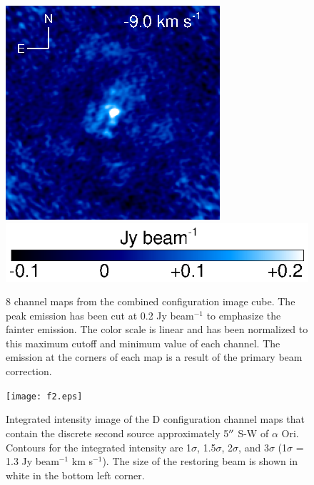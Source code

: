 \documentclass[preprint2]{aastex}
\begin{document}
\begin{figure}[hbt!]
{          \includegraphics[]{chan34.ps}
         }
\includegraphics[trim=0pt 20pt 180pt 10pt]{color_bar.ps}
\caption{8 channel maps from the combined configuration image cube. The peak emission has been cut at 0.2 Jy beam${{}^{-1}}$ to emphasize the fainter emission. The color scale is linear and has been normalized to this maximum cutoff and minimum value of each channel. The emission at the corners of each map is a result of the primary beam correction.}
\label{fig:fig3}
\end{figure}

\clearpage

\begin{figure}
\texttt{[image: f2.eps]}
\caption{Integrated intensity image of the D configuration channel maps that contain the discrete second source approximately 5$\mbox{$^{\prime\prime}$}$ S-W of $\alpha$ Ori. Contours for the integrated intensity are 1$\sigma$, 1.5$\sigma$, 2$\sigma$, and 3$\sigma$ (1$\sigma$ = 1.3 Jy beam${}^{-1}$ km s${}^{-1}$). The size of the restoring beam is shown in white in the bottom left corner.}
\label{fig:fig2}
\end{figure}

\clearpage
\end{document}
